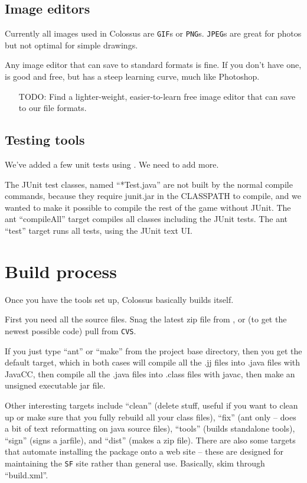 \documentclass{article}
\begin{document}
\subsection{Image editors}

Currently all images used in Colossus are \texttt{GIF}s or \texttt{PNG}s.
\texttt{JPEG}s are great for photos but not optimal for simple drawings.

Any image editor that can save to standard formats is fine. If you
don't have one,  is good and free,
but has a steep learning curve, much like Photoshop. 
\begin{itemize}
\item[TODO:] Find a lighter-weight, easier-to-learn free image editor that 
can save to our file formats.
\end{itemize}

\subsection{Testing tools}

We've added a few unit tests using .  
We need to add more.

The JUnit test classes, named ``*Test.java'' are not built by the normal 
compile commands, because they require junit.jar in the CLASSPATH to compile,
and we wanted to make it possible to compile the rest of the game without
JUnit.  The ant ``compileAll'' target compiles all classes including the
JUnit tests.  The ant ``test'' target runs all tests, using the JUnit text UI.

\section{Build process}

Once you have the tools set up, Colossus basically builds itself.

First you need all the source files. Snag the latest zip file from 
,
or (to get the newest possible code) pull from \texttt{CVS}.

If you just type ``ant'' or ``make'' from the project base directory,
then you get the default target, which in both cases will compile
all the .jj files into .java files with JavaCC, then compile all
the .java files into .class files with javac, then make an unsigned
executable jar file.

Other interesting targets include ``clean'' (delete stuff, useful if
you want to clean up or make sure that you fully rebuild all your
class files), ``fix'' (ant only -- does a bit of text reformatting on
java source files), ``tools'' (builds standalone tools), ``sign'' (signs
a jarfile), and ``dist'' (makes a zip file). There are also some
targets that automate installing the package onto a web site --
these are designed for maintaining the \texttt{SF} site rather than general
use. Basically, skim through ``build.xml''.



\end{document}
